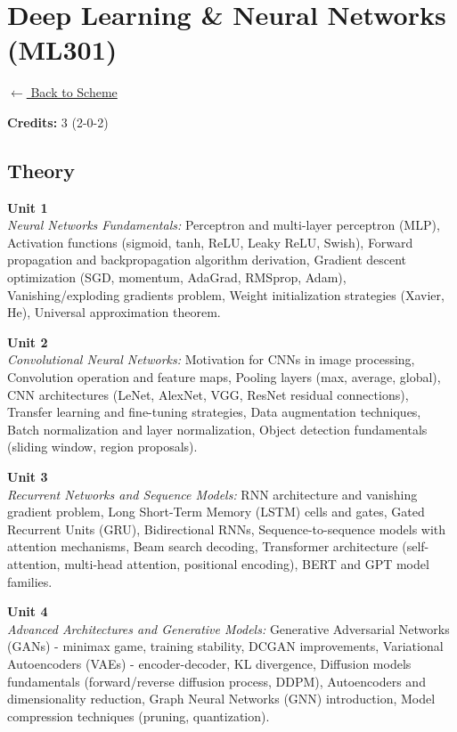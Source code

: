 \section*{Deep Learning \& Neural Networks (ML301)}
\label{major:ML_3}

\noindent \small{\hyperref[main:scheme]{$\leftarrow$ Back to Scheme}} \vspace{0.5cm}

\noindent \textbf{Credits:} 3 (2-0-2)

\subsection*{Theory}
\noindent\textbf{Unit 1} \\
\textit{Neural Networks Fundamentals:} Perceptron and multi-layer perceptron (MLP), Activation functions (sigmoid, tanh, ReLU, Leaky ReLU, Swish), Forward propagation and backpropagation algorithm derivation, Gradient descent optimization (SGD, momentum, AdaGrad, RMSprop, Adam), Vanishing/exploding gradients problem, Weight initialization strategies (Xavier, He), Universal approximation theorem.

\vspace{0.3cm}

\noindent\textbf{Unit 2} \\
\textit{Convolutional Neural Networks:} Motivation for CNNs in image processing, Convolution operation and feature maps, Pooling layers (max, average, global), CNN architectures (LeNet, AlexNet, VGG, ResNet residual connections), Transfer learning and fine-tuning strategies, Data augmentation techniques, Batch normalization and layer normalization, Object detection fundamentals (sliding window, region proposals).

\vspace{0.3cm}

\noindent\textbf{Unit 3} \\
\textit{Recurrent Networks and Sequence Models:} RNN architecture and vanishing gradient problem, Long Short-Term Memory (LSTM) cells and gates, Gated Recurrent Units (GRU), Bidirectional RNNs, Sequence-to-sequence models with attention mechanisms, Beam search decoding, Transformer architecture (self-attention, multi-head attention, positional encoding), BERT and GPT model families.

\vspace{0.3cm}

\noindent\textbf{Unit 4} \\
\textit{Advanced Architectures and Generative Models:} Generative Adversarial Networks (GANs) - minimax game, training stability, DCGAN improvements, Variational Autoencoders (VAEs) - encoder-decoder, KL divergence, Diffusion models fundamentals (forward/reverse diffusion process, DDPM), Autoencoders and dimensionality reduction, Graph Neural Networks (GNN) introduction, Model compression techniques (pruning, quantization).

